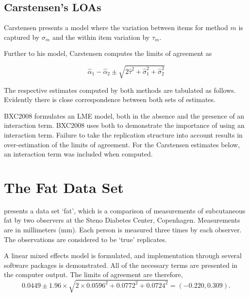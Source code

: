 \documentclass[12pt, a4paper]{report}
\theoremstyle{plain}
\theoremstyle{definition}
\theoremstyle{remark}
\begin{document}
	
	
	
	
	
	
	
	
	
	
	\subsection{Carstensen's LOAs}
	Carstensen presents a model where the variation between items for
	method $m$ is captured by $\sigma_m$ and the within item variation
	by $\tau_m$.
	
	Further to his model, Carstensen computes the limits of agreement
	as
	
	\[
	\hat{\alpha}_1 - \hat{\alpha}_2 \pm \sqrt{2 \hat{\tau}^2 +
		\hat{\sigma}^2_1 + \hat{\sigma}^2_2}
	\]
	
	
	
	The respective estimates computed by both methods are tabulated as follows. Evidently there is close correspondence between both sets of estimates.
	
	BXC2008 formulates an LME model, both in the absence and the presence of an interaction term. BXC2008 uses both to demonstrate the importance of using an interaction term. Failure to take the replication structure into
	account results in over-estimation of the limits of agreement. 
	For the Carstensen estimates below, an interaction term was included when computed.
	
	
	
	
	
	
	\section{The Fat Data Set}
	
	\citet{BXC2008} presents a data set `fat', which is a comparison of measurements of subcutaneous fat
	by two observers at the Steno Diabetes Center, Copenhagen. Measurements are in millimeters
	(mm). Each person is measured three times by each observer. The observations are considered to be `true' replicates.
	
	
	A linear mixed effects model is formulated, and implementation through several software packages is demonstrated.
	All of the necessary terms are presented in the computer output. The limits of agreement are therefore,
	\begin{equation}
	0.0449  \pm 1.96 \times  \sqrt{2 \times 0.0596^2 + 0.0772^2 + 0.0724^2} = (-0.220,  0.309).
	\end{equation}
	
\end{document}
